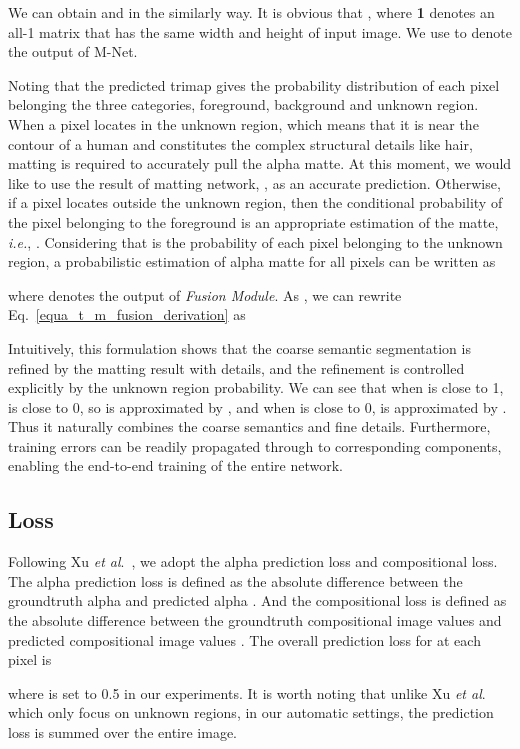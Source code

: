 We can obtain  and  in the similarly way.
It is obvious that , where \textbf{1} denotes an all-1 matrix that has the same width and height of input image.
We use  to denote the output of M-Net.

Noting that the predicted trimap gives the probability distribution of each pixel belonging the three categories, foreground, background and unknown region.
When a pixel locates in the unknown region, which means that it is near the contour of a human and constitutes the complex structural details like hair, matting is required to accurately pull the alpha matte.
At this moment, we would like to use the result of matting network, , as an accurate prediction.
Otherwise, if a pixel locates outside the unknown region, then the conditional probability of the pixel belonging to the foreground is an appropriate estimation of the matte, \emph{i.e.}, .
Considering that  is the probability of each pixel belonging to the unknown region, a probabilistic estimation of alpha matte for all pixels can be written as

where  denotes the output of \emph{Fusion Module}. As , we can rewrite Eq.~\ref{equa_t_m_fusion_derivation} as


Intuitively, this formulation shows that the coarse semantic segmentation is refined by the matting result with details, and the refinement is controlled explicitly by the unknown region probability.
We can see that when  is close to 1,  is close to 0, so  is approximated by , and
when  is close to 0,  is approximated by .
Thus it naturally combines the coarse semantics and fine details.
Furthermore, training errors can be readily propagated through to corresponding components, enabling the end-to-end training of the entire network.


\subsection{Loss}
Following Xu \emph{et al}.~\cite{xu2017deep}, we adopt the alpha prediction loss and compositional loss.
The alpha prediction loss is defined as the absolute difference between the groundtruth alpha  and predicted alpha .
And the compositional loss is defined as the absolute difference between the groundtruth compositional image values  and predicted compositional image values .
The overall prediction loss for  at each pixel is

where  is set to 0.5 in our experiments.
It is worth noting that unlike Xu \emph{et al}.~\cite{xu2017deep} which only focus on unknown regions, in our automatic settings, the prediction loss is summed over the entire image.

